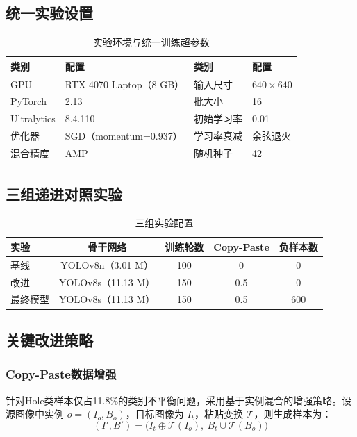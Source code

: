 \documentclass[12pt,a4paper]{ctexart}
\theoremstyle{cumcm}
\begin{document}
\subsection{统一实验设置}

\begin{table}[H]
\centering
{}
\caption{实验环境与统一训练超参数}
\begin{tabular}{llll}
\toprule
\textbf{类别} & \textbf{配置} & \textbf{类别} & \textbf{配置} \\
\midrule
GPU & RTX 4070 Laptop（8 GB） & 输入尺寸 & $640\times640$ \\
PyTorch & 2.13 & 批大小 & 16 \\
Ultralytics & 8.4.110 & 初始学习率 & 0.01 \\
优化器 & SGD（momentum=0.937） & 学习率衰减 & 余弦退火 \\
混合精度 & AMP & 随机种子 & 42 \\
\bottomrule
\end{tabular}
\end{table}

\subsection{三组递进对照实验}

\begin{table}[H]
\centering
{}
\caption{三组实验配置}
\begin{tabular}{lcccc}
\toprule
\textbf{实验} & \textbf{骨干网络} & \textbf{训练轮数} & \textbf{Copy-Paste} & \textbf{负样本数} \\
\midrule
基线 & YOLOv8n（3.01 M） & 100 & 0 & 0 \\
改进 & YOLOv8s（11.13 M） & 150 & 0.5 & 0 \\
最终模型 & YOLOv8s（11.13 M） & 150 & 0.5 & 600 \\
\bottomrule
\end{tabular}
\end{table}

\subsection{关键改进策略}

\subsubsection{Copy-Paste数据增强}

针对Hole类样本仅占11.8\%的类别不平衡问题，采用基于实例混合的增强策略。设源图像中实例 $o=(I_o,B_o)$，目标图像为 $I_t$，粘贴变换 $\mathcal{T}$，则生成样本为：
\begin{equation}
(I', B') = \bigl(I_t \oplus \mathcal{T}(I_o),\ B_t \cup \mathcal{T}(B_o)\bigr)
\end{equation}
\end{document}
